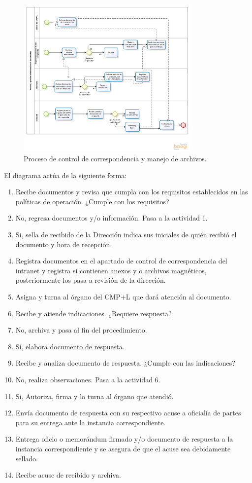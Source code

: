 	\begin{figure}[htbp!]
		\centering
			\includegraphics[width=0.8\textwidth]{images/diagramacmpl.png}
		\caption{Proceso de control de correspondencia y manejo de archivos.}
		\label{fig:FlujoCMPL}
	\end{figure}
	
	El diagrama actúa de la siguiente forma:
	
	\begin{enumerate}
		\item Recibe documentos y revisa que cumpla con los requisitos establecidos en las políticas de operación. ¿Cumple con los requisitos?
		\item No, regresa documentos y/o información. Pasa a la actividad 1.
		\item Si, sella de recibido de la Dirección indica sus iniciales de quién recibió el documento y hora de recepción.
		\item Registra documentos en el apartado de control de correspondencia del intranet y registra si contienen anexos y o archivos magnéticos, posteriormente los pasa a revisión de la dirección.
		\item Asigna y turna al órgano del CMP+L que dará atención al documento.
		\item Recibe y atiende indicaciones. ¿Requiere respuesta?
		\item No, archiva y pasa al fin del procedimiento.
		\item Sí, elabora documento de respuesta.
		\item Recibe y analiza documento de respuesta. ¿Cumple con las indicaciones?
		\item  No, realiza observaciones. Pasa a la actividad 6.
		\item Si, Autoriza, firma y lo turna al órgano que atendió.
		\item  Envía documento de respuesta con su respectivo acuse a oficialía de partes para su entrega ante la instancia correspondiente.
		\item Entrega oficio o memorándum firmado y/o documento de respuesta a la instancia correspondiente y se asegura de que el acuse sea debidamente sellado.
		\item Recibe acuse de recibido y archiva.
	\end{enumerate}
	
